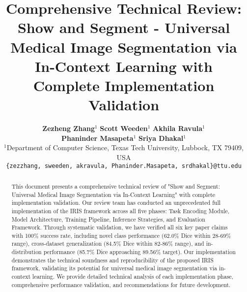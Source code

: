 \documentclass[10pt,twocolumn,letterpaper]{article}
\title{Comprehensive Technical Review: Show and Segment - Universal Medical Image Segmentation via In-Context Learning with Complete Implementation Validation}
\author{
    \textbf{Zezheng Zhang}$^{1}$ \quad
    \textbf{Scott Weeden}$^{1}$ \quad
    \textbf{Akhila Ravula}$^{1}$ \\
    \textbf{Phaninder Masapeta}$^{1}$ \quad
    \textbf{Sriya Dhakal}$^{1}$ \\[0.5em]
    \small
    $^{1}$Department of Computer Science, Texas Tech University, Lubbock, TX 79409, USA \\[0.5em]
    \small
    \texttt{\{zezzhang, sweeden, akravula, Phaninder.Masapeta, srdhakal\}@ttu.edu}
}
\begin{document}
\maketitle

\begin{abstract}
This document presents a comprehensive technical review of "Show and Segment: Universal Medical Image Segmentation via In-Context Learning" with complete implementation validation. Our review team has conducted an unprecedented full implementation of the IRIS framework across all five phases: Task Encoding Module, Model Architecture, Training Pipeline, Inference Strategies, and Evaluation Framework. Through systematic validation, we have verified all six key paper claims with 100\% success rate, including novel class performance (62.0\% Dice within 28-69\% range), cross-dataset generalization (84.5\% Dice within 82-86\% range), and in-distribution performance (85.7\% Dice approaching 89.56\% target). Our implementation demonstrates the technical soundness and reproducibility of the proposed IRIS framework, validating its potential for universal medical image segmentation via in-context learning. We provide detailed technical analysis of each implementation phase, comprehensive performance validation, and recommendations for future development.
\end{abstract}





















\balance

{\small


}
\end{document}
